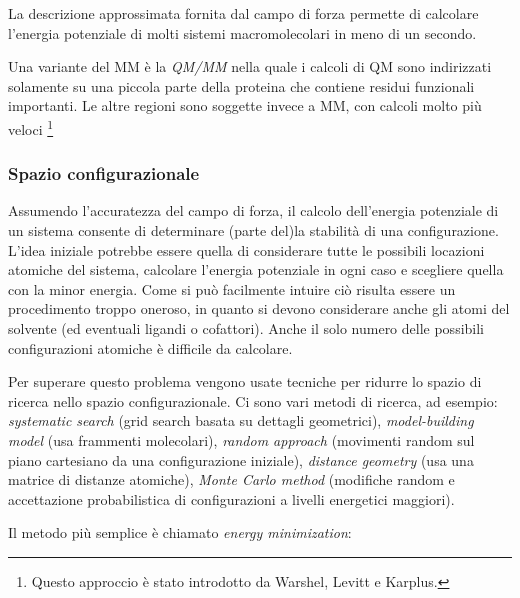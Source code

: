 {\par La descrizione approssimata fornita dal campo di forza permette di calcolare l'energia potenziale di molti sistemi macromolecolari in meno di un secondo. \\

\par Una variante del MM è la \textit{QM/MM} nella quale i calcoli di QM sono indirizzati solamente su una piccola parte della proteina che contiene residui funzionali importanti. Le altre regioni sono soggette invece a MM, con calcoli molto più veloci \footnote{Questo approccio è stato introdotto da Warshel, Levitt e Karplus.}

\subsubsection{Spazio configurazionale}

\par Assumendo l'accuratezza del campo di forza, il calcolo dell'energia potenziale di un sistema consente di determinare (parte del)la stabilità di una configurazione. L'idea iniziale potrebbe essere quella di considerare tutte le possibili locazioni atomiche del sistema, calcolare l'energia potenziale in ogni caso e scegliere quella con la minor energia. Come si può facilmente intuire ciò risulta essere un procedimento troppo oneroso, in quanto si devono considerare anche gli atomi del solvente (ed eventuali ligandi o cofattori). Anche il solo numero delle possibili configurazioni atomiche è difficile da calcolare.

\par Per superare questo problema vengono usate tecniche per ridurre lo spazio di ricerca nello spazio configurazionale. Ci sono vari metodi di ricerca, ad esempio: \textit{systematic search }(grid search basata su dettagli geometrici), \textit{model-building model }(usa frammenti molecolari), \textit{random approach }(movimenti random sul piano cartesiano da una configurazione iniziale), \textit{distance geometry} (usa una matrice di distanze atomiche), \textit{Monte Carlo method} (modifiche random e accettazione probabilistica di configurazioni a livelli energetici maggiori)\supercite{ROY2015151}.

\par Il metodo più semplice è chiamato \textit{energy minimization}:

}

